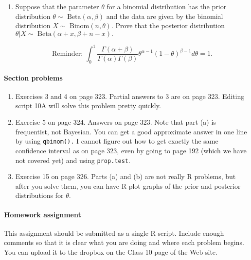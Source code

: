 \documentclass[12pt]{article}
\begin{document}
\begin{enumerate}
\begin{itemize}
\end{itemize}

\pagebreak

\item Suppose that the parameter $\theta$ for a binomial distribution has the prior distribution $\theta \sim \text{ Beta}(\alpha, \beta)$ and the data are given by the binomial distribution $X \sim \text{ Binom}(n, \theta).$ Prove that the posterior distribution\\ $\theta | X \sim \text{ Beta}(\alpha +x, \beta + n -x).$

$$\text{Reminder: }\int_0^1  \frac{\Gamma(\alpha + \beta)}{\Gamma(\alpha)\Gamma(\beta)} \theta^{\alpha-1}(1-\theta)^{\beta-1}d\theta  = 1.$$

\pagebreak

\end{enumerate}


\paragraph*{Section problems}

\begin{enumerate}

\item Exercises 3 and 4 on page 323. Partial answers to 3 are on page 323. Editing script 10A will solve this problem pretty quickly.

\item Exercise 5 on page 324. Answers on page 323. Note that part (a) is frequentist, not Bayesian.  You can get a good approximate answer in one line by using \verb!qbinom().! I cannot figure out how to get exactly the same confidence interval as on page 323, even by going to page 192 (which we have not covered yet) and using \verb!prop.test!.

\item Exercise 15 on page 326. Parts (a) and (b) are not really R problems, but after you solve them, you can have R plot graphs of the prior and posterior distributions for $\theta$.




\end{enumerate}
\pagebreak


\paragraph*{Homework assignment}

This assignment should be submitted as a single R script. Include enough comments so that it is clear what you are doing and where each problem begins. You can upload it to the dropbox on the Class 10 page of the Web site. 
\end{document}
